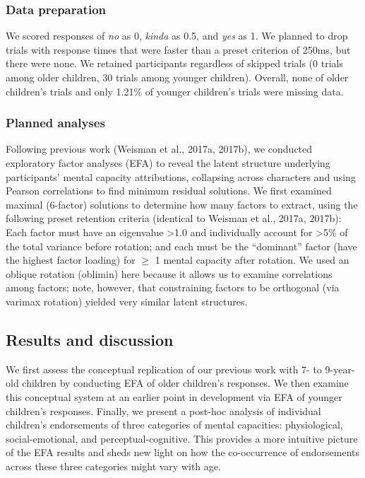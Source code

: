 \documentclass[10pt, letterpaper]{article}
\begin{document}
\subsubsection{Data preparation}\label{data-preparation}

We scored responses of \emph{no} as 0, \emph{kinda} as 0.5, and
\emph{yes} as 1. We planned to drop trials with response times that were
faster than a preset criterion of 250ms, but there were none. We
retained participants regardless of skipped trials (0 trials among older
children, 30 trials among younger children). Overall, none of older
children's trials and only 1.21\% of younger children's trials were
missing data.

\subsubsection{Planned analyses}\label{planned-analyses}

Following previous work (Weisman et al., 2017a, 2017b), we conducted
exploratory factor analyses (EFA) to reveal the latent structure
underlying participants' mental capacity attributions, collapsing across
characters and using Pearson correlations to find minimum residual
solutions. We first examined maximal (6-factor) solutions to determine
how many factors to extract, using the following preset retention
criteria (identical to Weisman et al., 2017a, 2017b): Each factor must
have an eigenvalue \textgreater{}1.0 and individually account for
\textgreater{}5\% of the total variance before rotation; and each must
be the ``dominant'' factor (have the highest factor loading) for
\(\geq\) 1 mental capacity after rotation. We used an oblique rotation
(oblimin) here because it allows us to examine correlations among
factors; note, however, that constraining factors to be orthogonal (via
varimax rotation) yielded very similar latent structures.

\subsection{Results and discussion}\label{results-and-discussion}

We first assess the conceptual replication of our previous work with 7-
to 9-year-old children by conducting EFA of older children's responses.
We then examine this conceptual system at an earlier point in
development via EFA of younger children's responses. Finally, we present
a post-hoc analysis of individual children's endorsements of three
categories of mental capacities: physiological, social-emotional, and
perceptual-cognitive. This provides a more intuitive picture of the EFA
results and sheds new light on how the co-occurrence of endorsements
across these three categories might vary with age.
\end{document}
